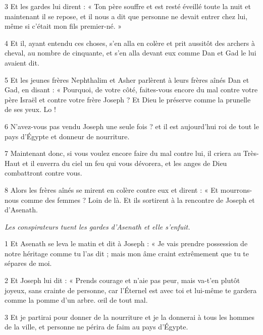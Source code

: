 \par 3 Et les gardes lui dirent : « Ton père souffre et est resté éveillé toute la nuit et maintenant il se repose, et il nous a dit que personne ne devait entrer chez lui, même si c'était mon fils premier-né. »

\par 4 Et il, ayant entendu ces choses, s'en alla en colère et prit aussitôt des archers à cheval, au nombre de cinquante, et s'en alla devant eux comme Dan et Gad le lui avaient dit.

\par 5 Et les jeunes frères Nephthalim et Asher parlèrent à leurs frères aînés Dan et Gad, en disant : « Pourquoi, de votre côté, faites-vous encore du mal contre votre père Israël et contre votre frère Joseph ? Et Dieu le préserve comme la prunelle de ses yeux. Lo !

\par 6 N'avez-vous pas vendu Joseph une seule fois ? et il est aujourd'hui roi de tout le pays d'Égypte et donneur de nourriture.

\par 7 Maintenant donc, si vous voulez encore faire du mal contre lui, il criera au Très-Haut et il enverra du ciel un feu qui vous dévorera, et les anges de Dieu combattront contre vous.

\par 8 Alors les frères aînés se mirent en colère contre eux et dirent : « Et mourrons-nous comme des femmes ? Loin de là. Et ils sortirent à la rencontre de Joseph et d'Asenath.


\par \textit{Les conspirateurs tuent les gardes d'Asenath et elle s'enfuit.}


\par 1 Et Asenath se leva le matin et dit à Joseph : « Je vais prendre possession de notre héritage comme tu l'as dit ; mais mon âme craint extrêmement que tu te sépares de moi.

\par 2 Et Joseph lui dit : « Prends courage et n'aie pas peur, mais va-t'en plutôt joyeux, sans crainte de personne, car l'Éternel est avec toi et lui-même te gardera comme la pomme d'un arbre. œil de tout mal.

\par 3 Et je partirai pour donner de la nourriture et je la donnerai à tous les hommes de la ville, et personne ne périra de faim au pays d'Égypte.

